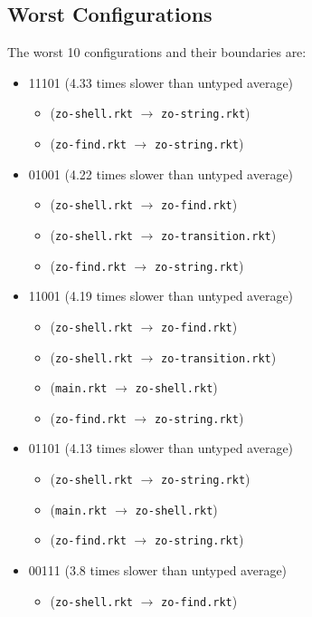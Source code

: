 \documentclass{article}
\newcommand{\mono}[1]{\texttt{#1}}
\begin{document}
\subsection{Worst Configurations}
The worst 10 configurations and their boundaries are:
\begin{itemize}
\item 11101 (4.33 times slower than untyped average)
  \begin{itemize}
  \item (\mono{zo-shell.rkt} $\rightarrow$ \mono{zo-string.rkt})
  \item (\mono{zo-find.rkt} $\rightarrow$ \mono{zo-string.rkt})
  \end{itemize}
\item 01001 (4.22 times slower than untyped average)
  \begin{itemize}
  \item (\mono{zo-shell.rkt} $\rightarrow$ \mono{zo-find.rkt})
  \item (\mono{zo-shell.rkt} $\rightarrow$ \mono{zo-transition.rkt})
  \item (\mono{zo-find.rkt} $\rightarrow$ \mono{zo-string.rkt})
  \end{itemize}
\item 11001 (4.19 times slower than untyped average)
  \begin{itemize}
  \item (\mono{zo-shell.rkt} $\rightarrow$ \mono{zo-find.rkt})
  \item (\mono{zo-shell.rkt} $\rightarrow$ \mono{zo-transition.rkt})
  \item (\mono{main.rkt} $\rightarrow$ \mono{zo-shell.rkt})
  \item (\mono{zo-find.rkt} $\rightarrow$ \mono{zo-string.rkt})
  \end{itemize}
\item 01101 (4.13 times slower than untyped average)
  \begin{itemize}
  \item (\mono{zo-shell.rkt} $\rightarrow$ \mono{zo-string.rkt})
  \item (\mono{main.rkt} $\rightarrow$ \mono{zo-shell.rkt})
  \item (\mono{zo-find.rkt} $\rightarrow$ \mono{zo-string.rkt})
  \end{itemize}
\item 00111 (3.8 times slower than untyped average)
  \begin{itemize}
  \item (\mono{zo-shell.rkt} $\rightarrow$ \mono{zo-find.rkt})

\end{itemize}
\end{itemize}
\end{document}
